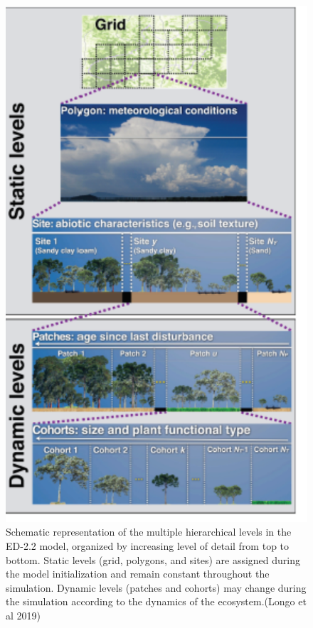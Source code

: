 \documentclass[
  12pt,
  oneside]{book}
\begin{document}
\begin{figure}

{\centering \includegraphics[width=0.8\linewidth]{figures/chap6/f615_ED_structure} 

}

\caption{Schematic representation of the multiple hierarchical levels in the ED-2.2 model, organized by increasing level of detail from top to bottom. Static levels (grid, polygons, and sites) are assigned during the model initialization and remain constant throughout the simulation. Dynamic levels (patches and cohorts) may change during the simulation according to the dynamics of the ecosystem.(Longo et al 2019)}\label{fig:f615}
\end{figure}
\end{document}
